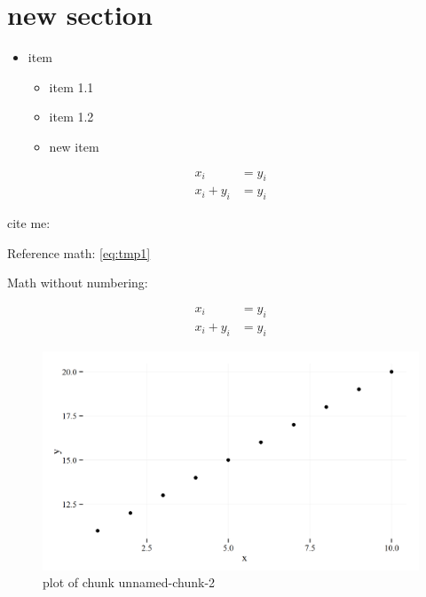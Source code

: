 \section{new section}\label{new-section}

\begin{itemize}
\itemsep1pt\parskip0pt
\item
  item

  \begin{itemize}
  \itemsep1pt\parskip0pt
  \item
    item 1.1
  \item
    item 1.2
  \item
    new item
  \end{itemize}
\end{itemize}

\begin{align}
x_i &= y_i \label{eq:tmp1}\\
x_i + y_i &= y_i
\end{align}

cite me: \textcite{Abb97}

Reference math: \eqref{eq:tmp1}

Math without numbering:

\begin{align*}
x_i &= y_i \\
x_i + y_i &= y_i
\end{align*}

\begin{Shaded}
\begin{Highlighting}[]
\StringTok{ }
\end{Highlighting}
\end{Shaded}

\begin{Shaded}
\begin{Highlighting}[]
\NormalTok{(}\NormalTok{(} \NormalTok{:}\NormalTok{, } \NormalTok{:}\NormalTok{)) +}\StringTok{ }
\StringTok{  }\NormalTok{(}\StringTok{ }
\StringTok{  }\NormalTok{()}
\end{Highlighting}
\end{Shaded}

\begin{figure}[htbp]
\centering
\includegraphics{figs/test/unnamed-chunk-2-1.png}
\caption{plot of chunk unnamed-chunk-2}
\end{figure}
